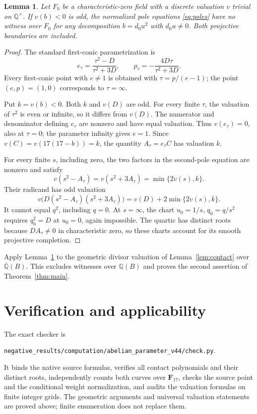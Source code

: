 \documentclass[11pt,a4paper]{article}
\newtheorem{lemma}[theorem]{Lemma}
\theoremstyle{remark}\newtheorem{remark}[theorem]{Remark}
\newcommand{\Q}{\mathbb Q}\newcommand{\Qbar}{\overline{\mathbb Q}}
\begin{document}
\begin{lemma}\label{lem:oddpole}
Let $F_0$ be a characteristic-zero field with a discrete valuation
$v$ trivial on $\Q^\times$. If $v(b)<0$ is odd, the normalized
pole equations \eqref{eq:poles} have no witness over $F_0$ for
any decomposition $b=d_0u^2$ with $d_0u\ne0$. Both projective
boundaries are included.
\end{lemma}
\begin{proof}
The standard first-conic parametrization is
\[
 e_\tau=\frac{\tau^2-D}{\tau^2+3D},\qquad
 p_\tau=-\frac{4D\tau}{\tau^2+3D}.
\]
Every first-conic point with $e\ne1$ is obtained with
$\tau=p/(e-1)$; the point $(e,p)=(1,0)$ corresponds to
$\tau=\infty$.

Put $k=v(b)<0$. Both $k$ and $v(D)$ are odd. For every finite
$\tau$, the valuation of $\tau^2$ is even or infinite, so it
differs from $v(D)$. The numerator and denominator defining
$e_\tau$ are nonzero and have equal valuation. Thus $v(e_\tau)=0$,
also at $\tau=0$; the parameter infinity gives $e=1$.
Since $v(C)=v(17(17-b))=k$, the quantity $A_\tau=e_\tau C$
has valuation $k$.

For every finite $s$, including zero, the two factors in the
second-pole equation are nonzero and satisfy
\[
 v(s^2-A_\tau)=v(s^2+3A_\tau)=\min\{2v(s),k\}.
\]
Their radicand has odd valuation
\[
 v\bigl(D(s^2-A_\tau)(s^2+3A_\tau)\bigr)
                    =v(D)+2\min\{2v(s),k\}.
\]
It cannot equal $q^2$, including $q=0$. At $s=\infty$, the
chart $u_0=1/s$, $q_0=q/s^2$ requires $q_0^2=D$ at $u_0=0$,
again impossible. The quartic has distinct roots because
$DA_\tau\ne0$ in characteristic zero, so these charts account
for its smooth projective completion.
\end{proof}

Apply Lemma~\ref{lem:oddpole} to the geometric divisor valuation
of Lemma~\ref{lem:contact} over $\Qbar(B)$. This excludes
witnesses over $\Q(B)$ and proves the second assertion of
Theorem~\ref{thm:main}.

\section{Verification and applicability}

The exact checker is
\begin{center}\small
\texttt{negative\_results/computation/abelian\_parameter\_v44/check.py}.
\end{center}
It binds the native source formulas, verifies all contact polynomials
and their distinct roots, independently counts both curves over
$\mathbf F_{17}$, checks the source point and the conditional weight
normalization, and audits the valuation formulas on finite integer
grids. The geometric arguments and universal valuation statements
are proved above; finite enumeration does not replace them.
\end{document}
